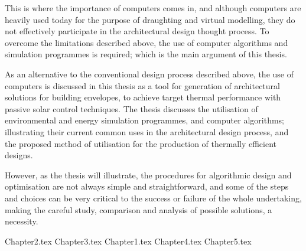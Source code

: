 This is where the importance of computers comes in, and although computers are heavily used today for the purpose of draughting and virtual modelling, they do not effectively participate in the architectural design thought process. To overcome the limitations described above, the use of computer algorithms and simulation programmes is required; which is the main argument of this thesis.

As an alternative to the conventional design process described above, the use of computers is discussed in this thesis as a tool for generation of architectural solutions for building envelopes, to achieve target thermal performance with passive solar control techniques. The thesis discusses the utilisation of environmental and energy simulation programmes, and computer algorithms; illustrating their current common uses in the architectural design process, and the proposed method of utilisation for the production of thermally efficient designs.

However, as the thesis will illustrate, the procedures for algorithmic design and optimisation are not always simple and straightforward, and some of the steps and choices can be very critical to the success or failure of the whole undertaking, making the careful study, comparison and analysis of possible solutions, a necessity.

\mainmatter

{Chapter2.tex}
{Chapter3.tex}
{Chapter1.tex}
{Chapter4.tex}
{Chapter5.tex}





